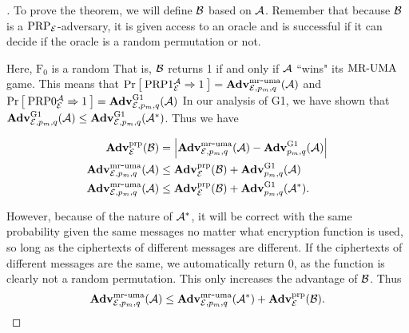 \begin{proof}[]
To prove the theorem, we will define ${\mathcal B}$ based on ${\mathcal A}$. Remember that because ${\mathcal B}$ is a $\textnormal{PRP}_{\cal E}$-adversary, it is given access to an oracle and is successful if it can decide if the oracle is a random permutation or not.
\begin{figure}[H]
\centering
{}
\end{figure}

Here, $\textrm{F}_0$ is a random That is, ${\mathcal B}$ returns 1 if and only if ${\mathcal A}$ ``wins" its $\textnormal{MR-UMA}$ game. This means that $\Pr\left[\: \textnormal{PRP}1_{\cal E}^{\mathcal A}\Rightarrow 1 \:\right]= \mathbf{Adv}^{\mathrm{mr\mbox{-} uma}}_{{\cal E},p_m,q}({\mathcal A})$ and
$\Pr\left[\: \textnormal{PRP}0_{\cal E}^{\mathcal A}\Rightarrow1 \:\right]=\mathbf{Adv}^{\textrm{G1}}_{{\cal E},p_m,q}({\mathcal A})$
In our analysis of G1, we have shown that $\mathbf{Adv}^{\textrm{G1}}_{{\cal E},p_m,q}({\mathcal A})\leq\mathbf{Adv}^{\textrm{G1}}_{{\cal E},p_m,q}({\mathcal A}^*)$. Thus we have

\begin{align*}
    \mathbf{Adv}^{\mathrm{prp}}_{{\cal E}}({\mathcal B})&=\left| \mathbf{Adv}^{\mathrm{mr\mbox{-} uma}}_{{\cal E},p_m,q}({\mathcal A})-\mathbf{Adv}^{\textrm{G1}}_{p_m,q}({\mathcal A}) \right|\\
    \mathbf{Adv}^{\mathrm{mr\mbox{-} uma}}_{{\cal E},p_m,q}({\mathcal A})&\leq\mathbf{Adv}^{\mathrm{prp}}_{{\cal E}}({\mathcal B})+\mathbf{Adv}^{\textrm{G1}}_{p_m,q}({\mathcal A})\\
    \mathbf{Adv}^{\mathrm{mr\mbox{-} uma}}_{{\cal E},p_m,q}({\mathcal A})&\leq\mathbf{Adv}^{\mathrm{prp}}_{{\cal E}}({\mathcal B})+\mathbf{Adv}^{\textrm{G1}}_{p_m,q}({\mathcal A}^*).
\end{align*}

However, because of the nature of ${\mathcal A}^*$, it will be correct with the same probability given the same messages no matter what encryption function is used, so long as the ciphertexts of different messages are different. If the ciphertexts of different messages are the same, we automatically return 0, as the function is clearly not a random permutation. This only increases the advantage of ${\mathcal B}$. Thus 
$$ \mathbf{Adv}^{\mathrm{mr\mbox{-} uma}}_{{\cal E},p_m,q}({\mathcal A}) \le 
        \mathbf{Adv}^{\mathrm{mr\mbox{-} uma}}_{{\cal E},p_m,q}({\mathcal A}^*) + \mathbf{Adv}^{\mathrm{prp}}_{{\cal E}}({\mathcal B}).$$

\end{proof}

